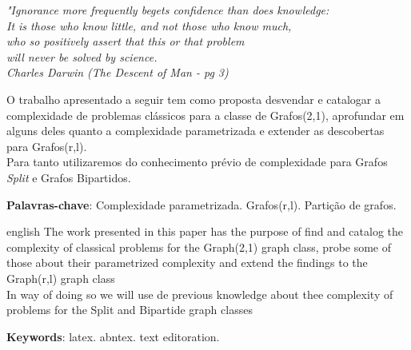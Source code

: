 \documentclass[
	12pt,				%
	openright,			%
	oneside,			%
	a4paper,			%
	english,			%
	french,				%
	spanish,			%
	brazil				%
	]{abntex2}
\begin{document}
\begin{agradecimentos}


\end{agradecimentos}

\begin{epigrafe}
    \vspace*{\fill}
	\begin{flushright}
		\textit{"Ignorance more frequently begets confidence than does knowledge:\\
		It is those who know little, and not those who know much,\\ who so positively assert that this or that problem\\ will never be solved by science.\\
		Charles Darwin (The Descent of Man - pg 3)}
	\end{flushright}
\end{epigrafe}


\setlength{\absparsep}{18pt} %
\begin{resumo}
 O trabalho apresentado a seguir tem como proposta desvendar e catalogar a complexidade
 de problemas clássicos para a classe de Grafos(2,1), aprofundar em alguns deles quanto
 a complexidade parametrizada e extender as descobertas para Grafos(r,l).\\
 Para tanto utilizaremos do conhecimento prévio de complexidade para Grafos \textit{Split}
 e Grafos Bipartidos.
 
 \vspace{\onelineskip}
 
 \textbf{Palavras-chave}: Complexidade parametrizada. Grafos(r,l). Partição de grafos.
\end{resumo}

\begin{resumo}[Abstract]
 \begin{otherlanguage*}{english}
   The work presented in this paper has the purpose of find and catalog the complexity
   of classical problems for the Graph(2,1) graph class, probe some of those about their 
   parametrized complexity and extend the findings to the Graph(r,l) graph class\\
   In way of doing so we will use de previous knowledge about thee complexity of problems for the
   Split and Bipartide graph classes

   \vspace{\onelineskip}
 
   \noindent 
   \textbf{Keywords}: latex. abntex. text editoration.
 \end{otherlanguage*}
\end{resumo}
\end{document}
